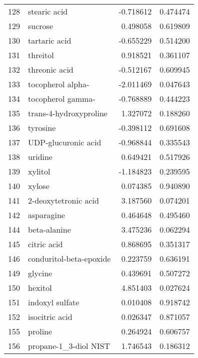 \begin{tabular}{llrr}
128 & stearic acid & -0.718612 & 0.474474 \\
129 & sucrose & 0.498058 & 0.619809 \\
130 & tartaric acid & -0.655229 & 0.514200 \\
131 & threitol & 0.918521 & 0.361107 \\
132 & threonic acid & -0.512167 & 0.609945 \\
133 & tocopherol alpha- & -2.011469 & 0.047643 \\
134 & tocopherol gamma- & -0.768889 & 0.444223 \\
135 & trans-4-hydroxyproline & 1.327072 & 0.188260 \\
136 & tyrosine & -0.398112 & 0.691608 \\
137 & UDP-glucuronic acid & -0.968844 & 0.335543 \\
138 & uridine & 0.649421 & 0.517926 \\
139 & xylitol & -1.184823 & 0.239595 \\
140 & xylose & 0.074385 & 0.940890 \\
141 & 2-deoxytetronic acid & 3.187560 & 0.074201 \\
142 & asparagine & 0.464648 & 0.495460 \\
144 & beta-alanine & 3.475236 & 0.062294 \\
145 & citric acid & 0.868695 & 0.351317 \\
146 & conduritol-beta-epoxide & 0.223759 & 0.636191 \\
149 & glycine & 0.439691 & 0.507272 \\
150 & hexitol & 4.851403 & 0.027624 \\
151 & indoxyl sulfate & 0.010408 & 0.918742 \\
152 & isocitric acid & 0.026347 & 0.871057 \\
155 & proline & 0.264924 & 0.606757 \\
156 & propane-1_3-diol NIST & 1.746543 & 0.186312 \\
\bottomrule
\end{tabular}
